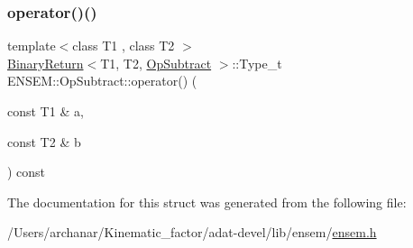 \subsubsection{\texorpdfstring{operator()()}{operator()()}\hspace{0.1cm}{\footnotesize\ttfamily [3/3]}}
{\footnotesize\ttfamily template$<$class T1 , class T2 $>$ \\
\mbox{\hyperlink{structENSEM_1_1BinaryReturn}{Binary\+Return}}$<$T1, T2, \mbox{\hyperlink{structENSEM_1_1OpSubtract}{Op\+Subtract}} $>$\+::Type\+\_\+t E\+N\+S\+E\+M\+::\+Op\+Subtract\+::operator() (\begin{DoxyParamCaption}\item[{const T1 \&}]{a,  }\item[{const T2 \&}]{b }\end{DoxyParamCaption}) const\hspace{0.3cm}{\ttfamily [inline]}}



The documentation for this struct was generated from the following file\+:\begin{DoxyCompactItemize}
\item 
/\+Users/archanar/\+Kinematic\+\_\+factor/adat-\/devel/lib/ensem/\mbox{\hyperlink{adat-devel_2lib_2ensem_2ensem_8h}{ensem.\+h}}\end{DoxyCompactItemize}
